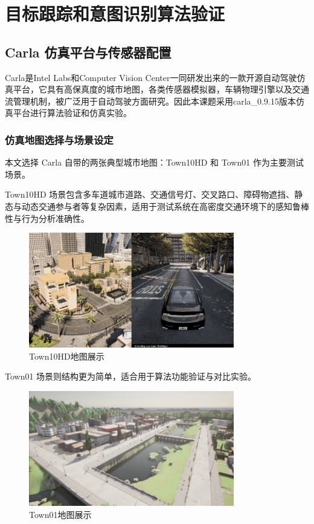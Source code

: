 \chapter{目标跟踪和意图识别算法验证}

\section{Carla 仿真平台与传感器配置}

Carla是Intel Labs和Computer Vision Center一同研发出来的一款开源自动驾驶仿真平台，它具有高保真度的城市地图，各类传感器模拟器，车辆物理引擎以及交通流管理机制，被广泛用于自动驾驶方面研究。因此本课题采用carla\_0.9.15版本仿真平台进行算法验证和仿真实验。

\subsection{仿真地图选择与场景设定}

本文选择 Carla 自带的两张典型城市地图：Town10HD 和 Town01 作为主要测试场景。

Town10HD 场景包含多车道城市道路、交通信号灯、交叉路口、障碍物遮挡、静态与动态交通参与者等复杂因素，适用于测试系统在高密度交通环境下的感知鲁棒性与行为分析准确性。

\begin{figure}[H]
	\centering
	\includegraphics[width=0.8\textwidth]{images/图4 Town10HD地图展示.pdf}  %
	\caption{Town10HD地图展示}
	\label{fig:example_image}  %
\end{figure}

Town01 场景则结构更为简单，适合用于算法功能验证与对比实验。

\begin{figure}[H]
	\centering
	\includegraphics[width=0.8\textwidth]{images/图5 Town01地图展示.pdf}  %
	\caption{Town01地图展示}
	\label{fig:example_image}  %
\end{figure}

